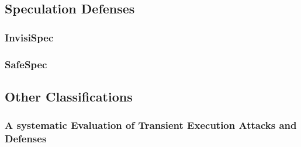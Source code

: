 \subsection{Speculation Defenses}
\subsubsection{InvisiSpec}
\subsubsection{SafeSpec}

\subsection{Other Classifications}
\subsubsection{A systematic Evaluation of Transient Execution Attacks and Defenses}
